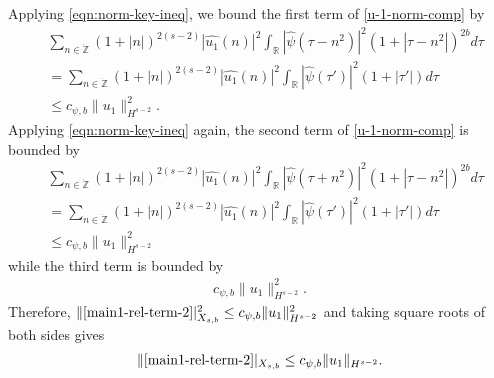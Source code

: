 \documentclass[12pt,reqno]{amsart}
\numberwithin{equation}{section}  %
\newcommand{\rr}{\mathbb{R}}
\newcommand{\zz}{\mathbb{Z}}
\newcommand{\wh}{\widehat}
\begin{document}
%
%
Applying \eqref{eqn:norm-key-ineq},
we bound the first term of
\eqref{u-1-norm-comp} by
%
%
%
\begin{equation*}
  \begin{split}
    & \sum_{n \in \dot{\zz}} \left( 1 + |n| \right)^{2(s-2)} | \wh{u_{1}}(n)
    |^{2} \int_{\rr} | \wh{\psi}(\tau - n^{2}) |^{2}\left( 1 +  | \tau  -
    n^{2} | \right)^{2b} d \tau
    \\
    & = \sum_{n \in \dot{\zz}} \left( 1 + |n| \right)^{2(s-2)} | \wh{u_{1}}(n)
    |^{2} \int_{\rr} | \wh{\psi}(\tau') |^{2}\left( 1 +  | \tau'| \right) d \tau
    \\
    & \le c_{\psi, b} \| u_{1} \|_{H^{s-2}}^{2}. 
  \end{split}
\end{equation*}
%
%
Applying
\eqref{eqn:norm-key-ineq} again, the
second term of \eqref{u-1-norm-comp} is bounded by
\begin{equation*}
  \begin{split}
    & \sum_{n \in \dot{\zz}} \left( 1 + |n| \right)^{2(s-2)} | \wh{u_{1}}(n)
    |^{2} \int_{\rr} | \wh{\psi}(\tau + n^{2}) |^{2}\left( 1 +  | \tau  -
    n^{2} | \right)^{2b} d \tau
    \\
    & = \sum_{n \in \dot{\zz}} \left( 1 + |n| \right)^{2(s-2)} | \wh{u_{1}}(n)
    |^{2} \int_{\rr} | \wh{\psi}(\tau') |^{2}\left( 1 +  | \tau'| \right) d \tau
    \\
    & \le c_{\psi, b} \| u_{1} \|_{H^{s-2}}^{2}
  \end{split}
\end{equation*}
while the third term is bounded by  
%
%
\begin{equation*}
\begin{split}
  c_{\psi, b} \| u_{1} \|_{H^{s-2}}^{2}.
\end{split}
\end{equation*}
%
%
Therefore, 
$\|\eqref{main1-rel-term-2}|_{X_{s,b}}^{2} \le c_{\psi, b}
\|u_{1}\|_{H^{s-2}}^2$ and
taking square roots of both sides gives
%
%
\begin{equation*}
  \begin{split}
    \|\eqref{main1-rel-term-2}|_{X_{s,b}} \le c_{\psi, b}
    \|u_{1}\|_{H^{s-2}}.
  \end{split}
\end{equation*}
%
%
\end{document}
